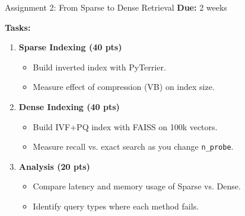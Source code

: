 \documentclass[aspectratio=169]{beamer}
\begin{document}
\begin{frame}[shrink=10]{Assignment 2: From Sparse to Dense Retrieval}
\textbf{Due:} 2 weeks

\vspace{1em}

\textbf{Tasks:}
\begin{enumerate}
    \item \textbf{Sparse Indexing (40 pts)}
    \begin{itemize}
        \item Build inverted index with PyTerrier.
        \item Measure effect of compression (VB) on index size.
    \end{itemize}
    
    \item \textbf{Dense Indexing (40 pts)}
    \begin{itemize}
        \item Build IVF+PQ index with FAISS on 100k vectors.
        \item Measure recall vs. exact search as you change \texttt{n\_probe}.
    \end{itemize}
    
    \item \textbf{Analysis (20 pts)}
    \begin{itemize}
        \item Compare latency and memory usage of Sparse vs. Dense.
        \item Identify query types where each method fails.
    \end{itemize}
\end{enumerate}
\end{frame}
\end{document}
